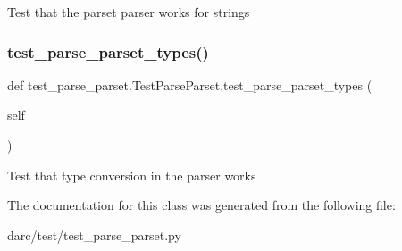 \begin{DoxyVerb}Test that the parset parser works for strings
\end{DoxyVerb}
 \mbox{\label{classtest__parse__parset_1_1_test_parse_parset_aac7bd0b62f4853395c2bb7cd3290bae6}} 
\subsubsection{\texorpdfstring{test\_parse\_parset\_types()}{test\_parse\_parset\_types()}}
{\footnotesize\ttfamily def test\+\_\+parse\+\_\+parset.\+Test\+Parse\+Parset.\+test\+\_\+parse\+\_\+parset\+\_\+types (\begin{DoxyParamCaption}\item[{}]{self }\end{DoxyParamCaption})}

\begin{DoxyVerb}Test that type conversion in the parser works
\end{DoxyVerb}
 

The documentation for this class was generated from the following file\+:\begin{DoxyCompactItemize}
\item 
darc/test/test\+\_\+parse\+\_\+parset.\+py\end{DoxyCompactItemize}
